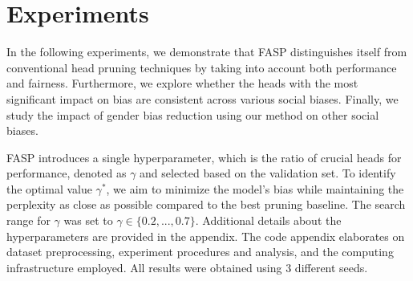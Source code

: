 \documentclass[letterpaper]{article} %
\newcommand{\goncalo}[1]
{\textcolor{orange}{{\bf}{\em #1}{\bf}}}
\begin{document}
\section{Experiments}\label{exp_details}

In the following experiments, we demonstrate that FASP distinguishes itself from conventional head pruning techniques by taking into account both performance and fairness. Furthermore, we explore whether the heads with the most significant impact on bias are consistent across various social biases. Finally, we study the impact of gender bias reduction using our method on other social biases.

FASP introduces a single hyperparameter, which is the ratio of crucial heads for performance, denoted as $\gamma$ and selected based on the validation set. To identify the optimal value $\gamma^*$, we aim to minimize the model's bias while maintaining the perplexity as close as possible compared to the best pruning baseline. The search range for $\gamma$ was set to $\gamma \in \{0.2, ..., 0.7\}$. Additional details about the hyperparameters are provided in the appendix. The code appendix elaborates on dataset preprocessing, experiment procedures and analysis, and the computing infrastructure employed. All results were obtained using $3$ different seeds.








\end{document}
